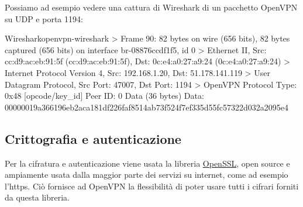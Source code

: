 Possiamo ad esempio vedere una cattura di Wireshark di un pacchetto OpenVPN su UDP e porta 1194:

\begin{bashcode}{Wireshark}{openvpn-wireshark}
> Frame 90: 82 bytes on wire (656 bits), 82 bytes captured (656 bits) on interface br-08876ccdf1f5, id 0
> Ethernet II, Src: cc:d9:ac:eb:91:5f (cc:d9:ac:eb:91:5f), Dst: 0c:e4:a0:27:a9:24 (0c:e4:a0:27:a9:24)
> Internet Protocol Version 4, Src: 192.168.1.20, Dst: 51.178.141.119
> User Datagram Protocol, Src Port: 47007, Dst Port: 1194
> OpenVPN Protocol
Type: 0x48 [opcode/key_id]
Peer ID: 0
Data (36 bytes)
Data: 00000019a366196eb2aca181df226faf8514ab73f524f7ef335d55fc57322d032a2095e4
\end{bashcode}

\subsection{Crittografia e autenticazione \ok}
\label{subsec:auth}

Per la cifratura e autenticazione viene usata la libreria \href{https://en.wikipedia.org/wiki/OpenSSL}{OpenSSL}, open source e ampiamente usata dalla maggior parte dei servizi su internet, come ad esempio l'https. Ciò fornisce ad OpenVPN la flessibilità di poter usare tutti i cifrari forniti da questa libreria.

